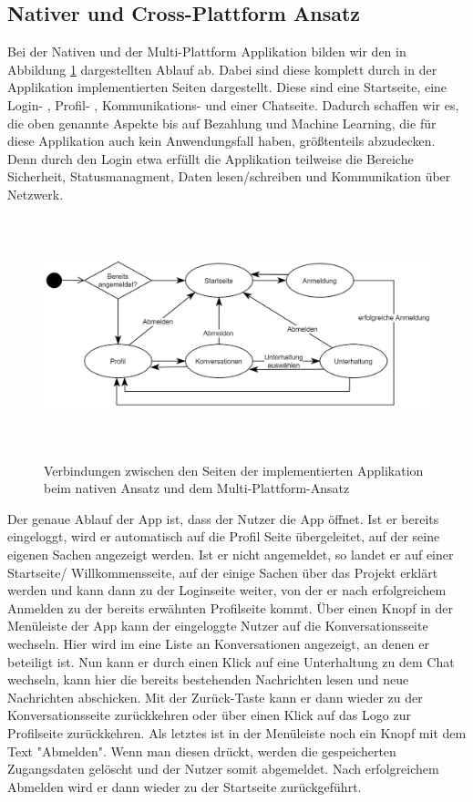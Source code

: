 \subsection{Nativer und Cross-Plattform Ansatz}
Bei der Nativen und der Multi-Plattform Applikation bilden wir den in Abbildung \ref{fig:pageflow} dargestellten Ablauf ab. Dabei sind diese komplett durch in der Applikation implementierten Seiten dargestellt. Diese sind eine Startseite, eine Login- , Profil- , Kommunikations- und einer Chatseite. Dadurch schaffen wir es, die oben genannte Aspekte bis auf Bezahlung und Machine Learning, die für diese Applikation auch kein Anwendungsfall haben, größtenteils abzudecken. Denn durch den Login etwa erfüllt die Applikation teilweise die Bereiche Sicherheit, Statusmanagment, Daten lesen/schreiben und Kommunikation über Netzwerk. 

\begin{figure}[ht]
  \centering
  \includegraphics[height=7cm,keepaspectratio]{images/Pageflow_native_flutter.png} 
  \caption{Verbindungen zwischen den Seiten der implementierten Applikation beim nativen Ansatz und dem Multi-Plattform-Ansatz}
  \label{fig:pageflow}
\end{figure}

Der genaue Ablauf der App ist, dass der Nutzer die App öffnet. Ist er bereits eingeloggt, wird er automatisch auf die Profil Seite übergeleitet, auf der seine eigenen Sachen angezeigt werden. Ist er nicht angemeldet, so landet er auf einer Startseite/ Willkommensseite, auf der einige Sachen über das Projekt erklärt werden und kann dann zu der Loginseite weiter, von der er nach erfolgreichem Anmelden zu der bereits erwähnten Profilseite kommt. Über einen Knopf in der Menüleiste der App kann der eingeloggte Nutzer auf die Konversationsseite wechseln. Hier wird im eine Liste an Konversationen angezeigt, an denen er beteiligt ist. Nun kann er durch einen Klick auf eine Unterhaltung zu dem Chat wechseln, kann hier die bereits bestehenden Nachrichten lesen und neue Nachrichten abschicken. Mit der Zurück-Taste kann er dann wieder zu der Konversationsseite zurückkehren oder über einen Klick auf das Logo zur Profilseite zurückkehren. Als letztes ist in der Menüleiste noch ein Knopf mit dem Text "Abmelden". Wenn man diesen drückt, werden die gespeicherten Zugangsdaten gelöscht und der Nutzer somit abgemeldet. Nach erfolgreichem Abmelden wird er dann wieder zu der Startseite zurückgeführt.


